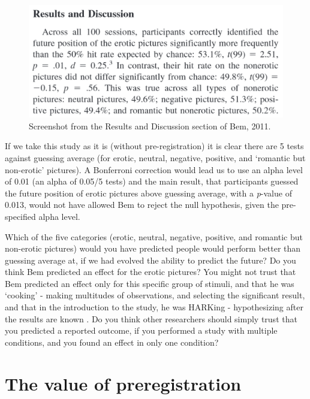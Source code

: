 \documentclass[
  oneside]{krantz}
\begin{document}
\begin{figure}

{\centering \includegraphics[width=1\linewidth]{images/bem} 

}

\caption{Screenshot from the Results and Discussion section of Bem, 2011.}\label{fig:bem}
\end{figure}

If we take this study as it is (without pre-registration) it is clear there are 5 tests against guessing average (for erotic, neutral, negative, positive, and `romantic but non-erotic' pictures). A Bonferroni correction would lead us to use an alpha level of 0.01 (an alpha of 0.05/5 tests) and the main result, that participants guessed the future position of erotic pictures above guessing average, with a \emph{p}-value of 0.013, would not have allowed Bem to reject the null hypothesis, given the pre-specified alpha level.

Which of the five categories (erotic, neutral, negative, positive, and romantic but non-erotic pictures) would you have predicted people would perform better than guessing average at, if we had evolved the ability to predict the future? Do you think Bem predicted an effect for the erotic pictures? You might not trust that Bem predicted an effect only for this specific group of stimuli, and that he was `cooking' - making multitudes of observations, and selecting the significant result, and that in the introduction to the study, he was HARKing - hypothesizing after the results are known \citep{kerr_harking_1998}. Do you think other researchers should simply trust that you predicted a reported outcome, if you performed a study with multiple conditions, and you found an effect in only one condition?

\hypertarget{the-value-of-preregistration}{%
\section{The value of preregistration}\label{the-value-of-preregistration}}
\end{document}
